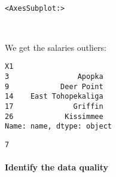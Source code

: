 \documentclass[11pt]{article}
\begin{document}
    \begin{center}
    \end{center}
    { \hspace*{\fill} \\}
    
            \begin{tcolorbox}[breakable, size=fbox, boxrule=.5pt, pad at break*=1mm, opacityfill=0]
\begin{Verbatim}[commandchars=\\\{\}]
<AxesSubplot:>
\end{Verbatim}
\end{tcolorbox}
        
    \begin{center}
    \end{center}
    { \hspace*{\fill} \\}
    
    We get the salaries outliers:

            \begin{tcolorbox}[breakable, size=fbox, boxrule=.5pt, pad at break*=1mm, opacityfill=0]
\begin{Verbatim}[commandchars=\\\{\}]
X1
3                Apopka
9            Deer Point
14    East Tohopekaliga
17              Griffin
26            Kissimmee
Name: name, dtype: object
\end{Verbatim}
\end{tcolorbox}
        
            \begin{tcolorbox}[breakable, size=fbox, boxrule=.5pt, pad at break*=1mm, opacityfill=0]
\begin{Verbatim}[commandchars=\\\{\}]
7
\end{Verbatim}
\end{tcolorbox}
        
    \hypertarget{identify-the-data-quality}{%
\paragraph{Identify the data quality}\label{identify-the-data-quality}}
\end{document}
